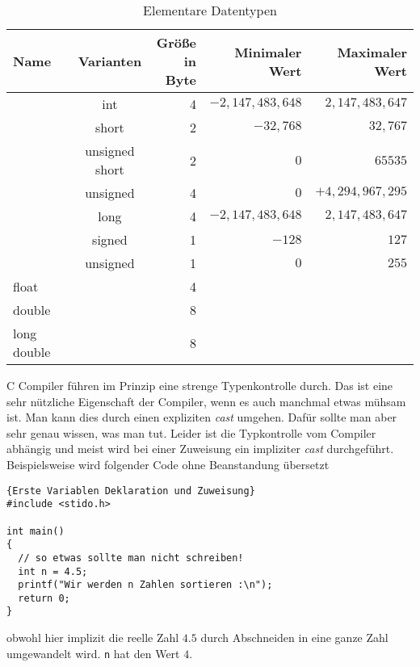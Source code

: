 \begin{table}[t]
\caption{Elementare Datentypen\label{tabelle1}}  %
\centering
\begin{tabular}{|l c c rrr|}
\hline
Name & & Varianten & Größe in Byte & Minimaler Wert & Maximaler Wert
\\[0.5ex]   
\hline %
                       & & int &4 & $-2,147,483,648$ & $2,147,483,647$ \\[-0.0ex]
                       & & short & 2 & $-32,768$ & $32,767$ \\[-0.0ex]
\raisebox{1ex}{int}  & & unsigned short& 2 & $0$ & $65535$ \\[-0.0ex]
                       & &unsigned& 4 & $0$ & $ +4,294,967,295$ \\[1ex]
                       & &long& 4 &  $-2,147,483,648$ & $2,147,483,647$ \\
\hline
                            & &signed & 1 & $-128$ & $127$ \\[-1ex]
\raisebox{1.5ex}{char} &    & unsigned &1 & $0$ & $255$  \\[1ex]
\hline
float & & & 4 &  &  \\
double& & & 8 &  &  \\
long double& & &8 &  &  \\[1ex]

\hline                          %
\end{tabular}
\label{tab:PPer}
\end{table}

C Compiler führen im Prinzip eine strenge Typenkontrolle durch.
Das ist eine sehr nützliche Eigenschaft der Compiler, wenn es auch manchmal etwas mühsam ist. 
Man kann dies durch einen expliziten \emph{cast} umgehen.
Dafür sollte man aber sehr genau wissen, was man tut.
Leider ist die Typkontrolle vom Compiler abhängig und meist wird bei einer Zuweisung ein impliziter \emph{cast} durchgeführt.
Beispielsweise wird folgender Code ohne Beanstandung übersetzt
\begin{lstlisting}{Erste Variablen Deklaration und Zuweisung}
#include <stido.h>

int main()
{
  // so etwas sollte man nicht schreiben!
  int n = 4.5;
  printf("Wir werden n Zahlen sortieren :\n");
  return 0;
}
\end{lstlisting}
obwohl hier implizit die reelle Zahl $4.5$ durch Abschneiden in eine ganze Zahl umgewandelt wird.
\texttt{n} hat den Wert $4$.

